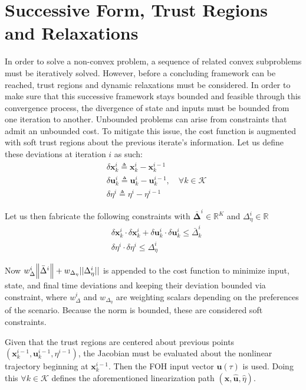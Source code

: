 \section{Successive Form, Trust Regions and Relaxations}

In order to solve a non-convex problem, a sequence of related convex subproblems must be iteratively solved. However, before a concluding framework can be reached, trust regions and dynamic relaxations must be considered. In order to make sure that this successive framework stays bounded and feasible through this convergence process, the divergence of state and inputs must be bounded from one iteration to another. Unbounded problems can arise from constraints that admit an unbounded cost. To mitigate this issue, the cost function is augmented with soft trust regions about the previous iterate's information. Let us define these deviations at iteration $i$ as such:
\begin{align}
& \delta \mathbf{x}_k^i \triangleq \mathbf{x}_k^i - \mathbf{x}_k^{i-1} \\
& \delta \mathbf{u}_k^i \triangleq \mathbf{u}_k^i - \mathbf{u}_k^{i-1}, \quad \forall k \in \mathcal{K}\\
& \delta \eta^i \triangleq \eta^i - \eta^{i-1}
\end{align}

Let us then fabricate the following constraints with $\bm{\bar{\Delta}}^i \in \mathbb{R}^K$ and $\Delta_\eta^i \in \mathbb{R}$
\begin{align}
& \delta \mathbf{x}_k^i \cdot \delta \mathbf{x}_k^i + \delta \mathbf{u}_k^i \cdot \delta \mathbf{u}_k^i \leq \bar{\Delta}_k^i \\
& \delta \eta^i \cdot \delta \eta^i \leq \Delta_\eta^i
\end{align}

Now $w_\Delta^i \norm{{\bar{\Delta}}^i} + w_{\Delta_\eta} ||\Delta_\eta^i ||$ is appended to the cost function to minimize input, state, and final time deviations and keeping their deviation bounded via constraint, where $w_\Delta^i$ and $w_{\Delta_\eta}$ are weighting scalars depending on the preferences of the scenario. Because the norm is bounded, these are considered soft constraints.

Given that the trust regions are centered about previous points $(\mathbf{x}_{k}^{i-1},\mathbf{u}_{k}^{i-1},\eta^{i-1})$, the Jacobian must be evaluated about the nonlinear trajectory beginning at $\mathbf{x}_{k}^{i-1}$. Then the FOH input vector $\mathbf{u}(\tau)$ is used. Doing this $\forall k \in \mathcal{K}$ defines the aforementioned linearization path $(\hat{\mathbf{x}}, \hat{\mathbf{u}}, \hat{\eta})$. 


